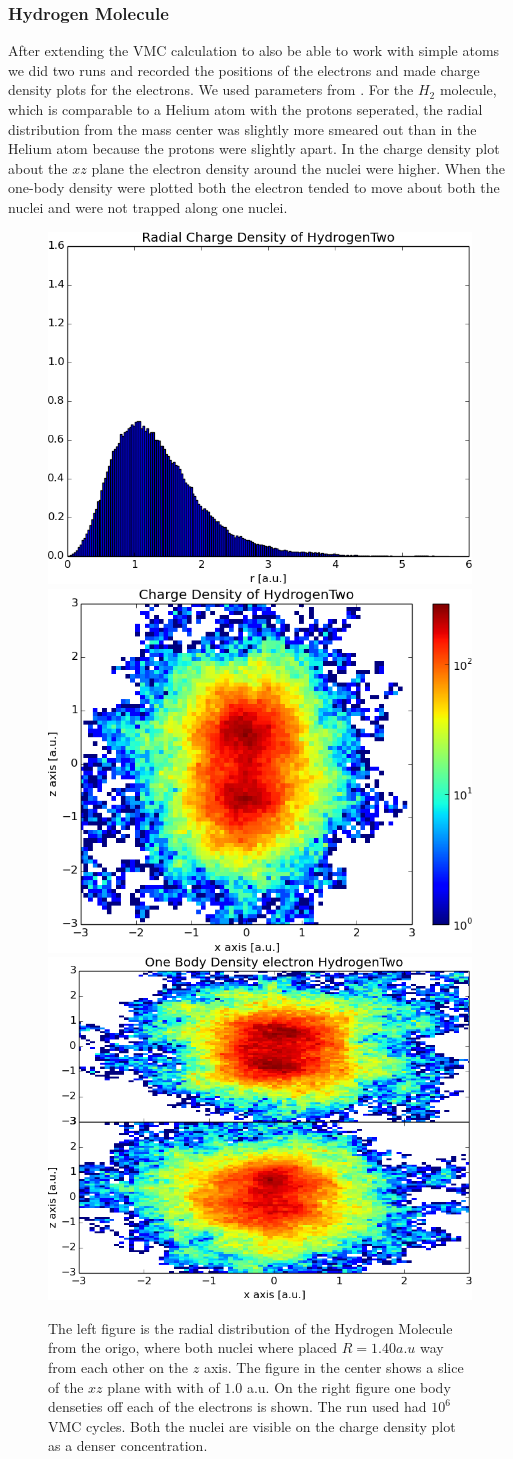 	\subsubsection{Hydrogen Molecule}
		After extending the VMC calculation to also be able to work with simple atoms we did two runs and recorded the positions of the electrons and made charge density plots for the electrons. We used parameters from \cite{Ihle_Ledum}.
		For the \(H_2\) molecule, which is comparable to a Helium atom with the protons seperated, the radial distribution from the mass center was slightly more smeared out than in the Helium atom because the protons were slightly apart.
		In the charge density plot about the \(xz\) plane the electron density around the nuclei were higher. When the one-body density were plotted both the electron tended to move about both the nuclei and were not trapped along one nuclei. 

		\begin{figure}
			\centering \includegraphics[width=0.32\linewidth]{../figures/used/ChargeDensityHydrogenTwo}
			\centering \includegraphics[width=0.32\linewidth]{../figures/used/OneBodyDensityHydrogenTwo}
			\centering \includegraphics[width=0.32\linewidth]{../figures/used/OneBodyDensityElectronsHydrogenTwo}
			\protect\caption{The left figure is the radial distribution of the Hydrogen Molecule from the origo, where both nuclei where placed \(R = 1.40 a.u\) way from each other on the \(z\) axis. The figure in the center shows a slice of the \(xz\) plane with with of \(1.0\) a.u. On the right figure one body denseties off each of the electrons is shown. The run used had $10^6$ VMC cycles. Both the nuclei are visible on the charge density plot as a denser concentration.}
			\label{fig:chargeDensityHydrogenTwo}
		\end{figure}



